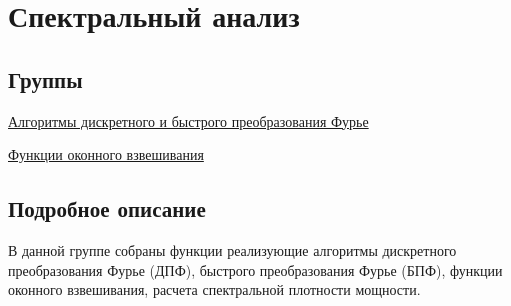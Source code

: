 \hypertarget{group___s_p_e_c_t_r_a_l___g_r_o_u_p}{}\section{Спектральный анализ}
\label{group___s_p_e_c_t_r_a_l___g_r_o_u_p}
\subsection*{Группы}
\begin{DoxyCompactItemize}
\item 
\hyperlink{group___d_f_t___g_r_o_u_p}{Алгоритмы дискретного и быстрого преобразования Фурье}
\item 
\hyperlink{group___w_i_n___g_r_o_u_p}{Функции оконного взвешивания}
\end{DoxyCompactItemize}


\subsection{Подробное описание}
В данной группе собраны функции реализующие алгоритмы дискретного преобразования Фурье (ДПФ), быстрого преобразования Фурье (БПФ), функции оконного взвешивания, расчета спектральной плотности мощности. 
